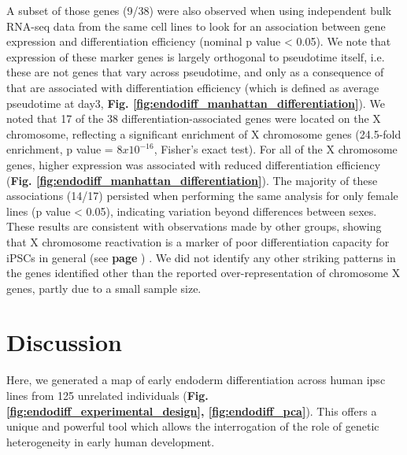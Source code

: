 A subset of those genes (9/38) were also observed when using independent bulk RNA-seq data from the same cell lines to look for an association between gene expression and differentiation efficiency (nominal p value < 0.05). 
We note that expression of these marker genes is largely orthogonal to pseudotime itself, i.e. these are not genes that vary across pseudotime, and only as a consequence of that are associated with differentiation efficiency (which is defined as average pseudotime at day3, \textbf{Fig. \ref{fig:endodiff_manhattan_differentiation}}). 
We noted that 17 of the 38 differentiation-associated genes were located on the X chromosome, reflecting a significant enrichment of X chromosome genes (24.5-fold enrichment, p value = $8x10^{-16}$, Fisher’s exact test). 
For all of the X chromosome genes, higher expression was associated with reduced differentiation efficiency (\textbf{Fig. \ref{fig:endodiff_manhattan_differentiation}}). 
The majority of these associations (14/17) persisted when performing the same analysis for only female lines (p value < 0.05), indicating variation beyond differences between sexes. \\

These results are consistent with observations made by other groups, showing that X chromosome reactivation is a marker of poor differentiation capacity for iPSCs in general (see \textbf{page \pageref{sec:ipsc_somatic_cell}}) \cite{anguera2012molecular, patel2017human}. 
We did not identify any other striking patterns in the genes identified other than the reported over-representation of chromosome X genes, partly due to a small sample size.

\section{Discussion}

Here, we generated a map of early endoderm differentiation across human \gls{ipsc} lines from 125 unrelated individuals  (\textbf{Fig. \ref{fig:endodiff_experimental_design}, \ref{fig:endodiff_pca}}).
This offers a unique and powerful tool which allows the interrogation of the role of genetic heterogeneity in early human development. \\

